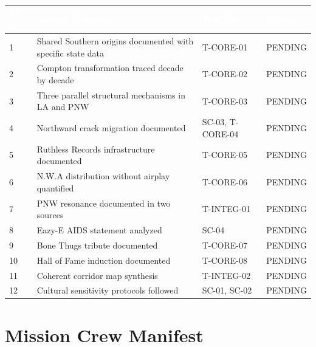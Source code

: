 \documentclass[11pt,letterpaper]{article}
\newcommand{\tableheader}[1]{\textbf{\sffamily\textcolor{white}{#1}}}
\begin{document}
\begin{center}
\begin{tabularx}{\textwidth}{C{1cm}XL{3cm}C{2cm}}
\toprule
{}
\tableheader{SC \#} & \tableheader{Success Criterion} & \tableheader{Test IDs} & \tableheader{Status} \\
 & Shared Southern origins documented with specific state data & T-CORE-01 & PENDING \\
2 & Compton transformation traced decade by decade & T-CORE-02 & PENDING \\
3 & Three parallel structural mechanisms in LA and PNW & T-CORE-03 & PENDING \\
4 & Northward crack migration documented & SC-03, T-CORE-04 & PENDING \\
5 & Ruthless Records infrastructure documented & T-CORE-05 & PENDING \\
6 & N.W.A distribution without airplay quantified & T-CORE-06 & PENDING \\
7 & PNW resonance documented in two sources & T-INTEG-01 & PENDING \\
8 & Eazy-E AIDS statement analyzed & SC-04 & PENDING \\
9 & Bone Thugs tribute documented & T-CORE-07 & PENDING \\
10 & Hall of Fame induction documented & T-CORE-08 & PENDING \\
11 & Coherent corridor map synthesis & T-INTEG-02 & PENDING \\
12 & Cultural sensitivity protocols followed & SC-01, SC-02 & PENDING \\
\bottomrule
\end{tabularx}
\end{center}

\section{Mission Crew Manifest}
\end{document}
